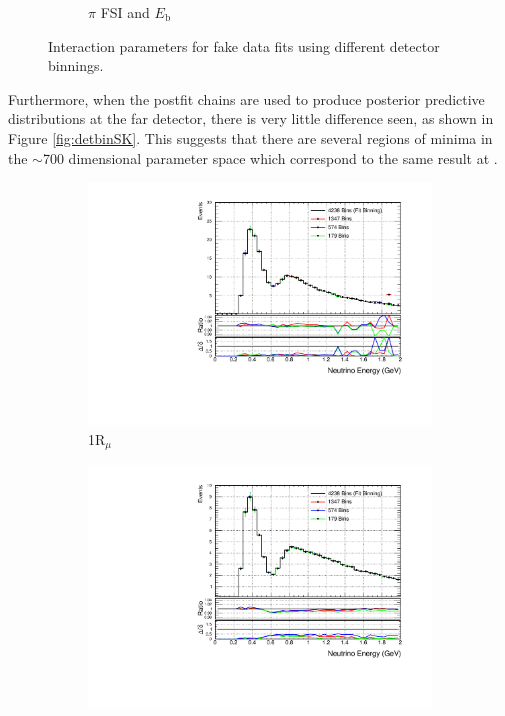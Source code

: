 \begin{figure}[!ht]
\begin{subfigure}{0.49\textwidth}
  \caption{$\pi$ FSI and $E_\mathrm{b}$}
\end{subfigure}
\caption{Interaction parameters for fake data fits using different detector binnings.}
\label{fig:detcovbinxsec}
\end{figure}

Furthermore, when the postfit chains are used to produce posterior predictive distributions at the far detector, there is very little difference seen, as shown in Figure \ref{fig:detbinSK}. This suggests that there are several regions of minima in the $\sim$700 dimensional parameter space which correspond to the same result at \SK. 

\begin{figure}[!ht]
\centering
\begin{subfigure}{.49\textwidth}
  \centering
  \includegraphics[width=0.95\linewidth]{figs/detbin_numu}
  \caption{1R$_{\mu}$}
\end{subfigure}
\begin{subfigure}{.49\textwidth}
  \centering
  \includegraphics[width=0.95\linewidth]{figs/detbin_numubar}

\end{subfigure}
\end{figure}
